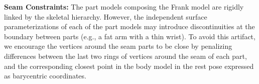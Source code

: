 \textbf{Seam Constraints:} The part models composing the Frank model are rigidly linked by the skeletal hierarchy. However, the independent surface parameterizations of each of the part models may introduce discontinuities at the boundary between parts (e.g., a fat arm with a thin wrist). To avoid this artifact, we encourage the vertices around the seam parts to be close by penalizing differences between the last two rings of vertices around the seam of each part, and the corresponding closest point in the body model in the rest pose expressed as barycentric coordinates. %
%

